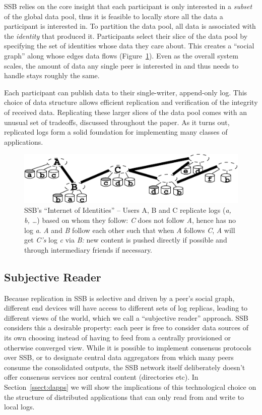 \documentclass[9pt,sigconf]{acmart}
\begin{document}
SSB relies on the core insight that each participant is only
interested in a \textit{subset} of the global data pool, thus it is
feasible to locally store all the data a participant is interested
in. To partition the data pool, all data is associated with the
\textit{identity} that produced it. Participants select their slice of
the data pool by specifying the set of identities whose data they care
about. This creates a ``social graph'' along whose edges data flows
(Figure~\ref{fig:net-of-people}). Even as the overall system scales,
the amount of data any single peer is interested in and thus needs to
handle stays roughly the same.

Each participant can publish data to their single-writer, append-only
log. This choice of data structure allows efficient replication and
verification of the integrity of received data. Replicating these
larger slices of the data pool comes with an unusual set of tradeoffs,
discussed throughout the paper. As it turns out, replicated logs form
a solid foundation for implementing many classes of applications.

\begin{figure}[htb]
  \includegraphics[width=0.9\columnwidth]{figs/net-of-people.pdf}
  \caption{SSB's ``Internet of Identities'' -- {\rm\small Users A, B
      and C replicate logs ({\em a, b, \ldots}) based on whom they
      follow: {\em C} does not follow {\em A}, hence has no log {\em
        a}. {\em A} and {\em B} follow each other such that when {\em
        A} follows {\em C}, {\em A} will get {\em C's} log {\em c} via
      {\em B:} new content is pushed directly if possible and through
      intermediary friends if necessary.}}
  \label{fig:net-of-people}
\end{figure}


\subsection*{Subjective Reader}

Because replication in SSB is selective and driven by a peer's
social graph, different end devices will have access to different sets
of log replicas, leading to different views of the world, which we call
a ``subjective reader'' approach. SSB considers this a desirable
property: each peer is free to
consider data sources of its own choosing instead of having to feed
from a centrally provisioned or otherwise converged view. While it is
possible to implement consensus protocols over SSB, or to designate
central data aggregators from which many peers consume the
consolidated outputs, the SSB network itself deliberately doesn't
offer consensus services nor central content (directories etc). In
Section~\ref{ssect:dapps} we will show the implications of this
technological choice on the structure of distributed applications that
can only read from and write to local logs.
\end{document}
